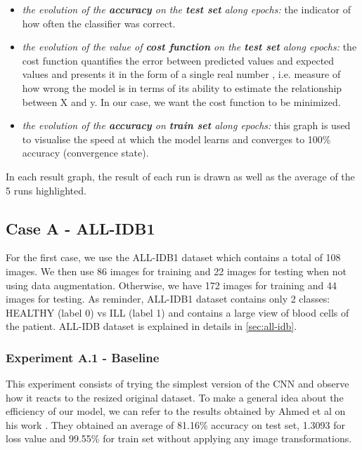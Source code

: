 \documentclass[11pt, openany]{report}
\theoremstyle{plain}
\theoremstyle{definition}
\theoremstyle{remark}
\begin{document}
\begin{itemize}
\item \textit{the evolution of the \textbf{accuracy} on the \textbf{test set} along epochs:} the indicator of how often the classifier was correct. 
\item \textit{the evolution of the value of \textbf{cost function} on the \textbf{test set} along epochs:} the cost function quantifies the error between predicted values and expected values and presents it in the form of a single real number \cite{TDS-CostFunction}, i.e. measure of how wrong the model is in terms of its ability to estimate the relationship between X and y. In our case, we want the cost function to be minimized.  
\item \textit{the evolution of the \textbf{accuracy} on \textbf{train set} along epochs:} this graph is used to visualise the speed at which the model learns and converges to 100\% accuracy (convergence state). 
\end{itemize}

In each result graph, the result of each run is drawn as well as the average of the 5 runs highlighted. 

\subsection{Case A - ALL-IDB1}

For the first case, we use the ALL-IDB1 dataset which contains a total of 108 images. We then use 86 images for training and 22 images for testing when not using data augmentation. Otherwise, we have 172 images for training and 44 images for testing. As reminder, ALL-IDB1 dataset contains only 2 classes: HEALTHY (label 0) vs ILL (label 1) and contains a large view of blood cells of the patient. ALL-IDB dataset is explained in details in \autoref{sec:all-idb}.    

\subsubsection{Experiment A.1 - Baseline}

This experiment consists of trying the simplest version of the CNN and observe how it reacts to the resized original dataset. To make a general idea about the efficiency of our model, we can refer to the results obtained by Ahmed et al on his work \cite{leukemia}. They obtained an average of 81.16\% accuracy on test set, 1.3093 for loss value and 99.55\% for train set without applying any image transformations. 
\end{document}
